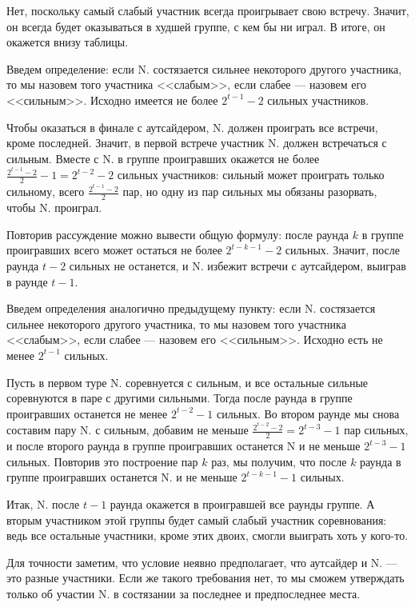 ﻿
\begin{itemize}
\itA Нет, поскольку самый слабый участник всегда проигрывает свою встречу.
Значит, он всегда будет оказываться в худшей группе, с кем бы ни играл.
В итоге, он окажется внизу таблицы.

\itB Введем определение: если N. состязается сильнее некоторого другого участника,
то мы назовем того участника <<слабым>>, если слабее --- назовем его <<сильным>>.
Исходно имеется не более $2^{t-1}-2$ сильных участников.

Чтобы оказаться в финале с аутсайдером, N. должен проиграть все встречи,
кроме последней. Значит, в первой встрече участник N. должен встречаться с сильным.
Вместе с N. в группе проигравших окажется не более $\frac{2^{t-1}-2}{2}-1 = 2^{t-2}-2$ 
сильных участников: сильный может проиграть только сильному, всего 
$\frac{2^{t-1}-2}{2}$ пар, но одну из пар сильных мы обязаны разорвать, чтобы 
N. проиграл.

Повторив рассуждение можно вывести общую формулу: после раунда $k$ 
в группе проигравших всего может остаться не более $2^{t-k-1}-2$ сильных. 
Значит, после раунда $t-2$ сильных не останется, и N. избежит встречи с аутсайдером, 
выиграв в раунде $t-1$.

\itC Введем определения аналогично предыдущему пункту: если N. состязается сильнее 
некоторого другого участника, то мы назовем того участника <<слабым>>, если 
слабее --- назовем его <<сильным>>. Исходно есть не менее $2^{t-1}$ сильных. 

Пусть в первом туре N. соревнуется с сильным, и все остальные\linebreak
сильные соревнуются в паре с другими сильными. 
Тогда после раунда в группе проигравших останется не менее $2^{t-2}-1$ сильных.
Во втором раунде мы снова составим пару N. с сильным, добавим не меньше $\frac{2^{t-2}-2}{2} = 2^{t-3}-1$ 
пар сильных, и после второго раунда в группе проигравших останется N и
не меньше $2^{t-3}-1$ сильных. Повторив это построение пар $k$ раз,
мы получим, что после $k$ раунда в группе проигравших останется N. и не меньше $2^{t-k-1}-1$ сильных. 

Итак, N. после $t-1$ раунда окажется в проигравшей все раунды 
группе. А вторым участником этой группы будет самый слабый участник соревнования:
ведь все остальные участники, кроме этих двоих, смогли выиграть хоть у кого-то. 

Для точности заметим, что условие неявно предполагает, что аутсайдер и N. --- 
это разные участники. Если же такого требования нет, то мы сможем утверждать только
об участии N. в состязании за последнее и предпоследнее места.
\end{itemize}
